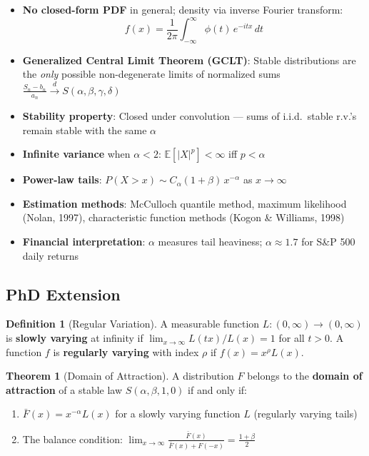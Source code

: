 \documentclass[11pt, a4paper]{article}
\newcommand{\E}{\mathbb{E}}
\theoremstyle{definition}
\newtheorem{defn}{Definition}
\newtheorem{thm}{Theorem}
\begin{document}
\begin{itemize}
  \item \textbf{No closed-form PDF} in general; density via inverse Fourier transform:
  \[
    f(x) = \frac{1}{2\pi}\int_{-\infty}^{\infty}\phi(t)\,e^{-itx}\,dt
  \]
  \item \textbf{Generalized Central Limit Theorem (GCLT)}: Stable distributions are the \textit{only} possible non-degenerate limits of normalized sums $\frac{S_n - b_n}{a_n} \xrightarrow{d} S(\alpha, \beta, \gamma, \delta)$
  \item \textbf{Stability property}: Closed under convolution — sums of i.i.d.\ stable r.v.'s remain stable with the same $\alpha$
  \item \textbf{Infinite variance} when $\alpha < 2$: $\E[|X|^p] < \infty$ iff $p < \alpha$
  \item \textbf{Power-law tails}: $P(X > x) \sim C_\alpha(1+\beta)\,x^{-\alpha}$ as $x \to \infty$
  \item \textbf{Estimation methods}: McCulloch quantile method, maximum likelihood (Nolan, 1997), characteristic function methods (Kogon \& Williams, 1998)
  \item \textbf{Financial interpretation}: $\alpha$ measures tail heaviness; $\alpha \approx 1.7$ for S\&P 500 daily returns
\end{itemize}

\subsection{PhD Extension}

\begin{defn}[Regular Variation]
A measurable function $L : (0,\infty) \to (0,\infty)$ is \textbf{slowly varying} at infinity if $\lim_{x\to\infty} L(tx)/L(x) = 1$ for all $t > 0$. A function $f$ is \textbf{regularly varying} with index $\rho$ if $f(x) = x^\rho L(x)$.
\end{defn}

\begin{thm}[Domain of Attraction]
A distribution $F$ belongs to the \textbf{domain of attraction} of a stable law $S(\alpha, \beta, 1, 0)$ if and only if:
\begin{enumerate}
  \item $\bar{F}(x) = x^{-\alpha}L(x)$ for a slowly varying function $L$ (regularly varying tails)
  \item The balance condition: $\lim_{x\to\infty} \frac{\bar{F}(x)}{\bar{F}(x) + F(-x)} = \frac{1+\beta}{2}$
\end{enumerate}
\end{thm}
\end{document}
